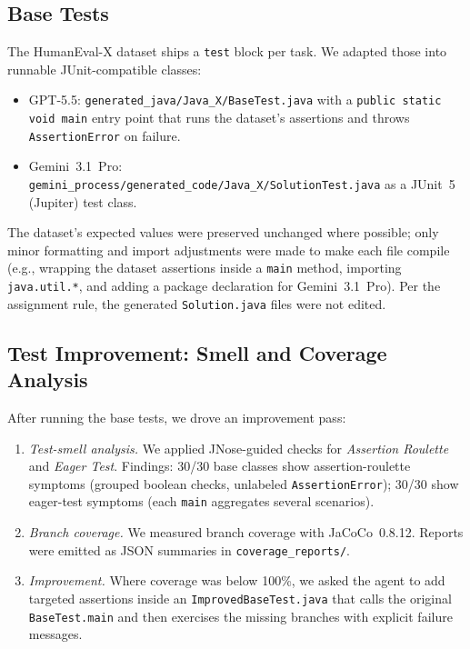 \documentclass[journal]{IEEEtran}
\begin{document}
\subsection{Base Tests}
The HumanEval-X dataset ships a \texttt{test} block per task.
We adapted those into runnable JUnit-compatible classes:
\begin{itemize}
    \item GPT-5.5: \texttt{generated\_java/Java\_X/BaseTest.java}
    with a \texttt{public static void main} entry point that
    runs the dataset's assertions and throws
    \texttt{AssertionError} on failure.
    \item Gemini~3.1~Pro:
    \texttt{gemini\_process/generated\_code/Java\_X/SolutionTest.java}
    as a JUnit~5 (Jupiter) test class.
\end{itemize}
The dataset's expected values were preserved unchanged where
possible; only minor formatting and import adjustments were
made to make each file compile (e.g., wrapping the dataset
assertions inside a \texttt{main} method, importing
\texttt{java.util.*}, and adding a package declaration for
Gemini~3.1~Pro). Per the assignment rule, the generated
\texttt{Solution.java} files were not edited.

\subsection{Test Improvement: Smell and Coverage Analysis}
\label{sec:improve}
After running the base tests, we drove an improvement pass:
\begin{enumerate}
    \item \emph{Test-smell analysis.} We applied JNose-guided
    checks for \emph{Assertion Roulette} and \emph{Eager
    Test}. Findings: 30/30 base classes show
    assertion-roulette symptoms (grouped boolean checks,
    unlabeled \texttt{AssertionError}); 30/30 show eager-test
    symptoms (each \texttt{main} aggregates several
    scenarios).
    \item \emph{Branch coverage.} We measured branch coverage
    with JaCoCo~0.8.12. Reports were emitted as JSON summaries
    in \texttt{coverage\_reports/}.
    \item \emph{Improvement.} Where coverage was below 100\%,
    we asked the agent to add targeted assertions inside an
    \texttt{ImprovedBaseTest.java} that calls the original
    \texttt{BaseTest.main} and then exercises the missing
    branches with explicit failure messages.
\end{enumerate}
\end{document}
